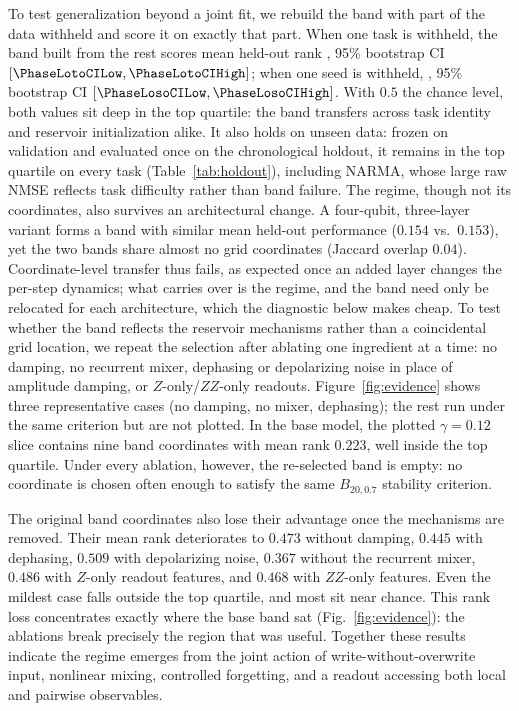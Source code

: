 \documentclass[10pt,conference]{IEEEtran}
\begin{document}
To test generalization beyond a joint fit, we rebuild the band with part of the data withheld and score it on exactly that part. When one task is withheld, the band built from the rest scores mean held-out rank \PhaseLotoMeanRank{}, 95\% bootstrap CI $[\PhaseLotoCILow,\PhaseLotoCIHigh]$; when one seed is withheld, \PhaseLosoMeanRank{}, 95\% bootstrap CI $[\PhaseLosoCILow,\PhaseLosoCIHigh]$. With $0.5$ the chance level, both values sit deep in the top quartile: the band transfers across task identity and reservoir initialization alike. It also holds on unseen data: frozen on validation and evaluated once on the chronological holdout, it remains in the top quartile on every task (Table~\ref{tab:holdout}), including NARMA, whose large raw NMSE reflects task difficulty rather than band failure. The regime, though not its coordinates, also survives an architectural change. A four-qubit, three-layer variant forms a band with similar mean held-out performance ($0.154$ vs.\ $0.153$), yet the two bands share almost no grid coordinates (Jaccard overlap $0.04$). Coordinate-level transfer thus fails, as expected once an added layer changes the per-step dynamics; what carries over is the regime, and the band need only be relocated for each architecture, which the diagnostic below makes cheap.
To test whether the band reflects the reservoir mechanisms rather than a coincidental grid location, we repeat the selection after ablating one ingredient at a time: no damping, no recurrent mixer, dephasing or depolarizing noise in place of amplitude damping, or $Z$-only\slash $ZZ$-only readouts. Figure~\ref{fig:evidence} shows three representative cases (no damping, no mixer, dephasing); the rest run under the same criterion but are not plotted. In the base model, the plotted $\gamma=0.12$ slice contains nine band coordinates with mean rank $0.223$, well inside the top quartile. Under every ablation, however, the re-selected band is empty: no coordinate is chosen often enough to satisfy the same $B_{20,0.7}$ stability criterion.

The original band coordinates also lose their advantage once the mechanisms are removed. Their mean rank deteriorates to $0.473$ without damping, $0.445$ with dephasing, $0.509$ with depolarizing noise, $0.367$ without the recurrent mixer, $0.486$ with $Z$-only readout features, and $0.468$ with $ZZ$-only features. Even the mildest case falls outside the top quartile, and most sit near chance. This rank loss concentrates exactly where the base band sat (Fig.~\ref{fig:evidence}): the ablations break precisely the region that was useful. Together these results indicate the regime emerges from the joint action of write-without-overwrite input, nonlinear mixing, controlled forgetting, and a readout accessing both local and pairwise observables.
\end{document}
